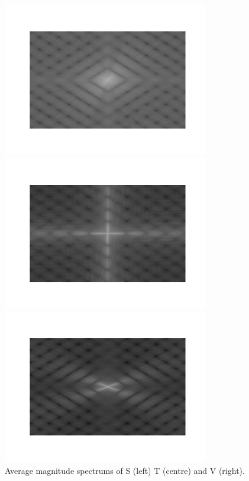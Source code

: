 \documentclass[11pt, a4paper]{article}
\begin{document}
\begin{figure}[ht]
\centering
	\begin{minipage}[b]{0.3\textwidth}
		\includegraphics[trim={2cm 2cm 2cm 2cm},clip,width=0.8\textwidth]{characters/S_average.png}
	\end{minipage}	
	\begin{minipage}[b]{0.3\textwidth}
		\includegraphics[trim={2cm 2cm 2cm 2cm},clip,width=0.8\textwidth]{characters/T_average.png}
	\end{minipage}
	\begin{minipage}[b]{0.3\textwidth}
		\includegraphics[trim={2cm 2cm 2cm 2cm},clip,width=0.8\textwidth]{characters/V_average.png}
	\end{minipage}
	\caption{Average magnitude spectrums of S (left) T (centre) and V (right).}
	\label{fig:averages}
\end{figure}
\end{document}
